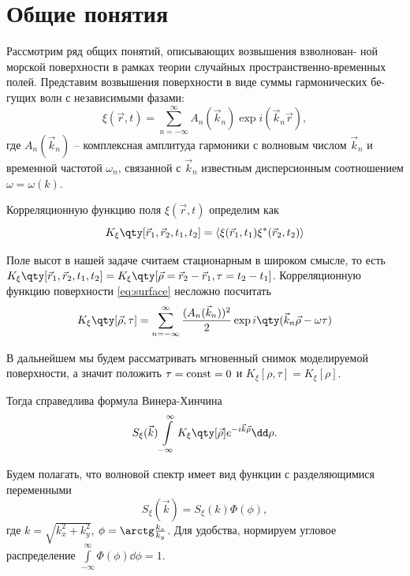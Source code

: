 \documentclass[a4paper,14pt]{extarticle}
\newcommand{\mean}[1]{\langle#1\rangle}
\newcommand\ct[1]{\text{\rmfamily\upshape #1}}
\newcommand*{\const}{\ct{const}}
\begin{document}
\section{Общие понятия}%
\label{sec:obshchie_poniatiia}

Рассмотрим ряд общих понятий, описывающих возвышения взволнован-
ной морской поверхности в рамках теории случайных пространственно-временных
полей. Представим возвышения поверхности в виде суммы гармонических бе-
гущих волн с независимыми фазами:
\begin{equation}
    \label{eq:surface}
    \xi(\vec r,t) = \sum\limits_{n=-\infty}^{\infty} 
    A_n(\vec k_n) \exp{i(\vec k_n \vec r)},
\end{equation}
где $A_n (\vec k_n)$ -- комплексная амплитуда гармоники с волновым числом
$\vec k_n$ и временной частотой  $\omega_n$, связанной с  $\vec k_n$ известным
дисперсионным соотношением  $\omega = \omega(k)$.

Корреляционную функцию поля  $\xi(\vec r, t) $ определим как
 \begin{equation}
    \label{eq:corr}
    K_{\xi}\qty[\vec r_1, \vec r_2, t_1,t_2] = \mean{\xi(\vec r_1,t_1)\xi^*(\vec r_2,t_2)}
\end{equation}

Поле высот в нашей задаче считаем стационарным в широком смысле, то есть 
$K_{\xi}\qty[\vec r_{1},\vec r_{2},t_{1},t_{2}] = K_{\xi}\qty[\vec \rho = \vec
r_{2} - \vec r_1, \tau=t_{2}-t_{1}]$. Корреляционную функцию поверхности
\eqref{eq:surface} несложно посчитать
\begin{equation}
    \label{eq:surface_corr}
    K_{\xi}\qty[\vec \rho,\tau] = \sum\limits_{n=-\infty}^{\infty} 
    \frac{(A_n (\vec k_n))^2}{2} \exp{i \qty(\vec k_n \vec \rho - \omega \tau)}
\end{equation}

В дальнейшем мы будем рассматривать мгновенный снимок моделируемой поверхности,
а значит положить $\tau = \const = 0$  и  $K_\xi[\rho,\tau] = K_\xi [\rho]$.

Тогда справедлива формула Винера-Хинчина
\begin{equation}
    \label{eq:Viner-Hinchin}
    S_\xi(\vec k) \int\limits_{-\infty}^{\infty} K_\xi \qty[\vec \rho] e^{- i
    \vec k \vec \rho} \dd \rho. 
\end{equation}

Будем полагать, что волновой спектр имеет вид функции с разделяющимися
переменными
\begin{equation}
    S_\xi(\vec k) = S_\xi(k) \Phi(\phi),
\end{equation}
где $k = \sqrt{k_x^2 + k_y^2}$,  $\phi = \arctg \frac{k_x}{k_y}$. Для удобства,
нормируем угловое распределение $\int\limits_{-\infty}^{\infty} \Phi(\phi) \dd
\phi = 1$.
\end{document}
